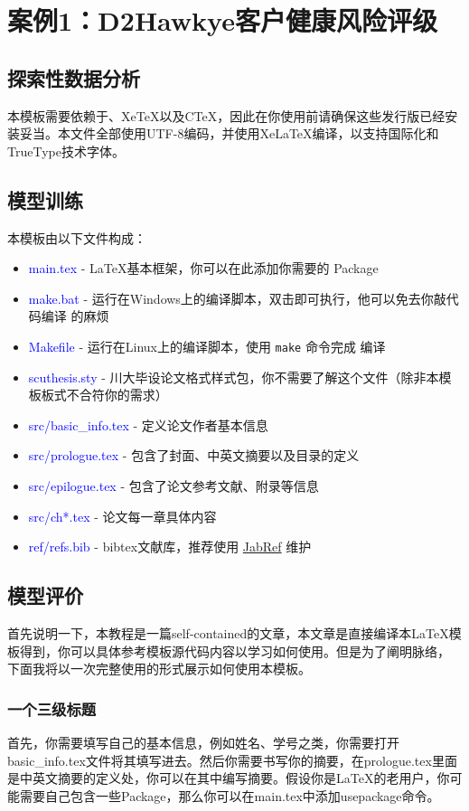 \chapter{案例1：D2Hawkye客户健康风险评级}
\section{探索性数据分析}
本模板需要依赖于\LaTeXe 、Xe\TeX 以及C\TeX ，因此在你使用前请确保这些发行版已经安装妥当。本文件全部使用UTF-8编码，并使用Xe\LaTeX 编译，以支持国际化和TrueType技术字体。

\section{模型训练}
本模板由以下文件构成：
\begin{itemize}
\item \textcolor{blue}{main.tex} - \LaTeX 基本框架，你可以在此添加你需要的
  Package
\item \textcolor{blue}{make.bat} - 运行在Windows上的编译脚本，双击即可执行，他可以免去你敲代码编译
  的麻烦 \smiley
\item \textcolor{blue}{Makefile} - 运行在Linux上的编译脚本，使用 \verb|make| 命令完成
  编译
\item \textcolor{blue}{scuthesis.sty} - 川大毕设论文格式样式包，你不需要了解这个文件（除非本模板板式不合符你的需求）
\item \textcolor{blue}{src/basic\_info.tex} - 定义论文作者基本信息
\item \textcolor{blue}{src/prologue.tex} - 包含了封面、中英文摘要以及目录的定义
\item \textcolor{blue}{src/epilogue.tex} - 包含了论文参考文献、附录等信息
\item \textcolor{blue}{src/ch*.tex} - 论文每一章具体内容
\item \textcolor{blue}{ref/refs.bib} - bibtex文献库，推荐使用 \href{http://jabref.sourceforge.net/}{JabRef} 维护
\end{itemize}

\section{模型评价}
首先说明一下，本教程是一篇self-contained的文章，本文章是直接编译本\LaTeX 模板得到，你可以具体参考模板源代码内容以学习如何使用。但是为了阐明脉络， 下面我将以一次完整使用的形式展示如何使用本模板。
\subsection{一个三级标题}
首先，你需要填写自己的基本信息，例如姓名、学号之类，你需要打开basic\_info.tex文件将其填写进去。然后你需要书写你的摘要，在prologue.tex里面是中英文摘要的定义处，你可以在其中编写摘要。假设你是\LaTeX 的老用户，你可能需要自己包含一些Package，那么你可以在main.tex中添加usepackage命令。
